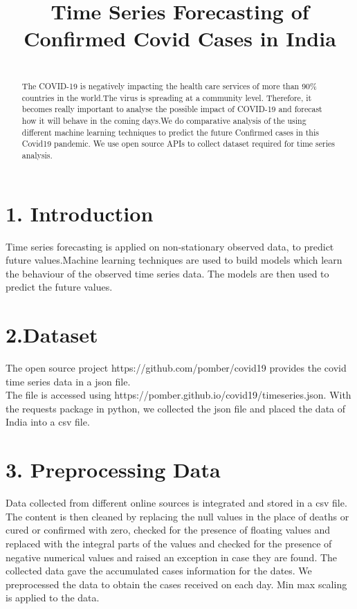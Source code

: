 \documentclass{cup-ino}
\title{Time Series Forecasting of Confirmed Covid Cases in India}
\begin{document}
\maketitle
\begin{abstract} 
\\
\normalsize The COVID-19  is negatively impacting the health care services of more than 90\% countries in the world.The virus is spreading at a community level. Therefore, it becomes really important to analyse the possible impact of COVID-19 and forecast how it will behave in the coming days.We do comparative analysis of the using different machine learning techniques to predict the future Confirmed cases in this Covid19 pandemic. We use open source APIs to collect dataset required for time series analysis.
\end{abstract}
\vspace{-10mm}
\section{1. Introduction}
Time series forecasting is applied on non-stationary observed data, to predict future values.Machine learning techniques are used to build models which learn the behaviour of the observed time series data. The models are then used to predict the future values. 

\section{2.Dataset}
The open source project https://github.com/pomber/covid19 provides the covid time series data in a json file.
\\
The file is accessed using https://pomber.github.io/covid19/timeseries.json. 
With the requests package in python, we collected the json file and placed the data of India into a csv file.

\section{3. Preprocessing Data}
Data collected from different online sources is integrated and stored in a csv file.
The content is then cleaned by replacing the null values in the place of deaths or cured or confirmed with zero, checked for the presence of floating values and replaced with the integral parts of the values and checked for the presence of negative numerical values and raised an exception in case they are found.
The collected data gave the accumulated cases information for the dates. We preprocessed the data to obtain the cases received on each day.
Min max scaling is applied to the data.
\end{document}
